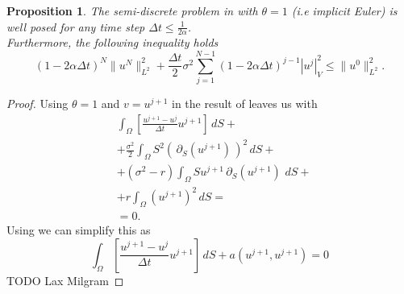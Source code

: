 \documentclass{article}
\newtheorem{prop}[thm]{Proposition}
\newcommand{\argwrapsquare}[1]{\left[#1\right]}
\newcommand{\intS}[1]{\ensuremath{\int_{\Omega}#1 \, dS}}
\newcommand{\intSlong}[1]{\intS{\argwrapsquare{#1}}}
\newcommand{\darg}[2]{\ensuremath{\, \partial_{#2}#1} \, }
\newcommand{\dS}[1]{\ensuremath{\darg{#1}{S}}}
\newcommand{\sigmafrac}{\ensuremath{\frac{\sigma^2}{2}}}
\newcommand{\seminormsq}[1]{\ensuremath{|#1|_V^2}}
\begin{document}
\begin{prop}
    The semi-discrete problem in  with $\theta = 1$ (i.e implicit Euler) is well posed for any time step $\Delta t \leq \frac{1}{2 \alpha}$.\\
    Furthermore, the following inequality holds
    \begin{equation*}
        (1 - 2\alpha \Delta t)^N \| u^N \|_{L^2}^2 + \frac{\Delta t}{2} \sigma^2 \sum_{j=1}^{N-1} (1 - 2\alpha \Delta t)^{j-1} \seminormsq{u^j} \leq \| u^0 \|_{L^2}^2.
        \label{eq:placeholder_label}
    \end{equation*}
\end{prop}
\begin{proof}
    Using $\theta = 1$ and $v = u^{j+1}$ in the result of  leaves us with
    \begin{align*}
        &\intSlong{\frac{u^{j+1} - u^j}{\Delta t}  u^{j+1}} + \\
        &+\sigmafrac \intS{S^2 (\dS{(u^{j+1})})^2} + \\
        &+ (\sigma^2 - r) \intS{S u^{j+1} \dS{(u^{j+1})}} + \\
        &+r \intS{(u^{j+1})^2} =\\
        &=0.
        \end{align*}
    Using  we can simplify this as
    \begin{equation}\label{eq:discret_time_and_a_u_j+1}
    \intSlong{\frac{u^{j+1} - u^j}{\Delta t}  u^{j+1}} + a(u^{j+1},u^{j+1}) = 0
    \end{equation}
   TODO Lax Milgram


\end{proof}
\end{document}
